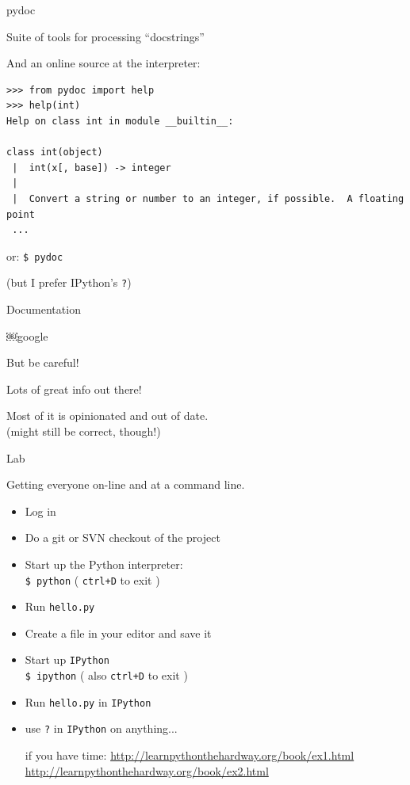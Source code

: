 \documentclass{beamer}
\begin{document}
\begin{frame}[fragile]{pydoc}

Suite of tools for processing ``docstrings''

And an online source at the interpreter:

\begin{verbatim}
>>> from pydoc import help
>>> help(int)
Help on class int in module __builtin__:

class int(object)
 |  int(x[, base]) -> integer
 |  
 |  Convert a string or number to an integer, if possible.  A floating point
 ...
\end{verbatim}
or: \verb+$ pydoc+

(but I prefer IPython's  \verb+?+)

\end{frame} 

\begin{frame}[fragile]{Documentation}

{\LARGE￼google}

\vspace{0.25in}
But  be careful!

\vspace{0.25in}
Lots of great info out there!

\vspace{0.25in}
Most of it is opinionated and out of date.\\
(might still be correct, though!)

\end{frame} 

\begin{frame}[fragile]{Lab}

{\Large Getting everyone on-line and at a command line.}

\begin{itemize}
    \item Log in
    \item Do a git or SVN checkout of the project
    \item Start up the Python interpreter:\\
          \verb+$ python+  ( \verb=ctrl+D= to exit )
    \item Run \verb+hello.py+
    \item Create a file in your editor and save it
    \item Start up \verb+IPython+ \\
          \verb+$ ipython+ ( also \verb=ctrl+D= to exit )
    \item Run \verb+hello.py+ in \verb+IPython+
    \item use \verb+?+ in \verb+IPython+ on anything...

if you have time:
\vspace{0.2in}
\url{http://learnpythonthehardway.org/book/ex1.html}
\url{http://learnpythonthehardway.org/book/ex2.html}

    
\end{itemize}

\end{frame} 
\end{document}
